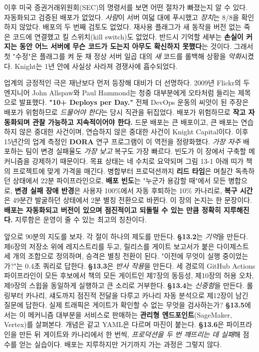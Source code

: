 이후 미국 증권거래위원회(SEC)의 명령서를 보면 어떤 절차가 빠졌는지 알 수 있다. 자동화되고 검증된 배포가 없었다. \textit{사람}이 서버 여덟 대에 푸시했고 \textit{장치}는 8/8을 확인하지 않았다. 배포의 두 번째 검토도 없었다. 재사용 플래그가 새 동작을 버전 없는 죽은 코드에 연결했고 킬 스위치(kill switch)도 없었다. 반드시 기억할 세부는 \textbf{손실이 커지는 동안 어느 서버에 무슨 코드가 도는지 아무도 확신하지 못했다}는 것이다. 그래서 첫 "수정"은 플래그를 켜 둔 채 정상 서버 일곱 대의 \textit{새} 코드를 롤백해 상황을 \textit{악화}시켰다. Knight는 1년 안에 사실상 사라져 경쟁사에 흡수되었다.

업계의 긍정적인 극은 재난보다 먼저 등장해 대비가 더 선명하다. 2009년 Flickr의 두 엔지니어 John Allspaw와 Paul Hammond는 청중 대부분에게 오타처럼 들리는 제목으로 발표했다. \textbf{"10+ Deploys per Day."} 전체 DevOps 운동의 씨앗이 된 주장은 배포가 위험하므로 \textit{드물어야 한다}는 당시 직관을 뒤집었다. 배포가 위험하므로 \textbf{작고 자동화되며 관찰 가능하고 지속적이어야 한다.} 드문 배포는 큰 배포이고, 큰 배포는 연습하지 않은 중대한 사건이며, 연습하지 않은 중대한 사건이 Knight Capital이다. 이후 15년간의 업계 측정인 \textbf{DORA} 연구 프로그램이 이 역전을 정량화했다. \textit{가장 자주} 배포하는 팀이 변경 실패율도 \textit{가장 낮고} 복구도 가장 빠르다. 빈도가 이 장에서 구축할 메커니즘을 강제하기 때문이다. 목표 상태는 네 수치로 요약되며 그림 13-1 아래 띠가 책의 프로젝트에 맞게 가격을 매긴다. 병합부터 프로덕션까지 \textbf{리드 타임}은 며칠간 독촉하던 상태에서 22분 파이프라인으로, \textbf{배포 빈도}는 "누군가 용감할 때"에서 모든 병합으로, \textbf{변경 실패 장애 반경}은 사용자 100\%에서 자동 후퇴하는 10\% 카나리로, \textbf{복구 시간}은 49분간 발굴하던 상태에서 2분 별칭 전환으로 바뀐다. 이 장의 논지는 한 문장이다. \textbf{배포는 자동화되고 버전이 있으며 점진적이고 되돌릴 수 있는 만큼 정확히 지루해진다.} 지루함은 운영이 줄 수 있는 최고의 칭찬이다.

앞으로 90분의 지도를 보자. 각 절이 하나의 제도를 만든다. \textbf{§13.2}는 \textit{기억}을 만든다. 제6장의 저장소 위에 레지스트리를 두고, 릴리스를 게이트 보고서가 붙은 다이제스트 세 개의 조합으로 정의하며, 승격은 별칭 전환이 된다. "이전에 무엇이 실행 중이었는가?"는 0.4초 쿼리로 답한다. \textbf{§13.3}은 \textit{반사 작용}을 만든다. 세 경로의 GitHub Actions 파이프라인이 모든 후보에서 책의 모든 게이트인 제7장의 동등성, 제10장의 허용 오차, 제9장의 스윕을 동일하게 실행하고 큰 소리로 거부한다. \textbf{§13.4}는 \textit{신중함}을 만든다. 롤링부터 카나리, 섀도까지 점진적 전달을 다루고 카나리 자동 분석으로 제12장이 남긴 질문에 답한다. 실제 트래픽은 게이트가 확인할 수 없는 무엇을 검사하는가? \textbf{§13.5}에서는 이 메커니즘 대부분을 서비스로 판매하는 \textbf{관리형 엔드포인트}(SageMaker, Vertex)를 살펴본다. 개념은 같고 YAML은 다르며 마진이 붙는다. \textbf{§13.6}은 파이프라인을 만든 뒤 게이트와 카나리에서 한 번씩, \textit{프로덕션을 두 번 깨뜨리는 데 실패}해 점수를 얻는 실습이다. 배포는 지루하지만 거기까지 가는 과정은 그렇지 않다.


